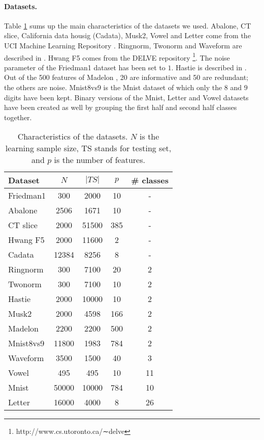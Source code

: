 \documentclass{article}
\begin{document}
\paragraph{Datasets.}%
Table \ref{tab:datasets} sums up the main characteristics of the datasets we 
used. Abalone, CT slice, California data housig (Cadata), Musk2, Vowel and 
Letter come from the UCI Machine Learning Repository \cite{uci}. Ringnorm, 
Twonorm and Waveform are described in \cite{breiman1998arcing}. Hwang F5 comes 
from the DELVE repository \footnote{http://www.cs.utoronto.ca/∼delve}.
The noise parameter of the Friedman1 dataset \cite{friedman11991} has 
been set to $1$. Hastie is described in \cite{hastie2009}. Out of the 500 
features of Madelon \cite{guyon2004madelon}, 20 are informative and 50 are 
redundant; the others are noise.
Mnist8vs9 is the Mnist dataset \cite{lecun1998mnist} of which only the $8$ and 
$9$ digits have been kept. Binary versions of the Mnist, Letter and Vowel 
datasets have been created as well by grouping the first half and second half 
classes together.

\begin{table}[th]
\caption{Characteristics of the datasets. $N$ is the learning sample size, TS 
stands for testing set, and $p$ is the number of features.}
\label{tab:datasets}
\begin{center}
\begin{footnotesize}
\begin{sc}
\begin{tabular}{l|cccc}
\hline
Dataset & $N$ & $|TS|$ & $p$ & \# classes\\
\hline
Friedman1 & 300 & 2000 & 10 & - \\
Abalone & 2506 & 1671 & 10 & - \\
CT slice & 2000 & 51500 & 385 & - \\
Hwang F5 & 2000 & 11600 & 2 & - \\
Cadata & 12384 & 8256 & 8 & - \\
Ringnorm & 300 & 7100 & 20 & 2 \\
Twonorm & 300 & 7100 & 10 & 2 \\
Hastie & 2000 & 10000 & 10 & 2 \\
Musk2 & 2000 & 4598 & 166 & 2 \\
Madelon & 2200 & 2200 & 500 & 2 \\
Mnist8vs9 & 11800 & 1983 & 784 & 2 \\
Waveform & 3500 & 1500 & 40 & 3 \\
Vowel & 495 & 495 & 10 & 11 \\
Mnist & 50000 & 10000 & 784 & 10 \\
Letter & 16000 & 4000 & 8 & 26 \\
\hline
\end{tabular}
\end{sc}
\end{footnotesize}
\end{center}
\vskip -0.2in
\end{table}
\end{document}
